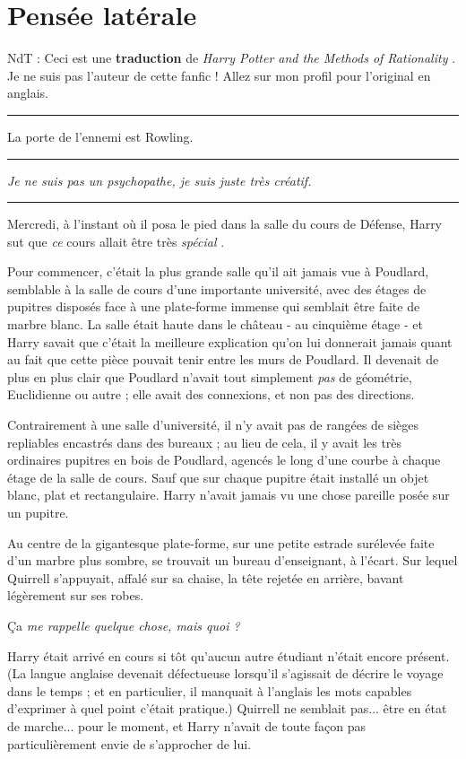 
\chapter{Pensée latérale}

NdT : Ceci est une \textbf{traduction}  de \emph{Harry Potter and the Methods of Rationality} . Je ne suis pas l'auteur de cette fanfic ! Allez sur mon profil pour l'original en anglais.
\par\noindent\rule{\textwidth}{0.4pt}
La porte de l'ennemi est Rowling.
\par\noindent\rule{\textwidth}{0.4pt}
\emph{Je ne suis pas un psychopathe, je suis juste très créatif.} 
\par\noindent\rule{\textwidth}{0.4pt}
Mercredi, à l'instant où il posa le pied dans la salle du cours de Défense, Harry sut que \emph{ce}  cours allait être très \emph{spécial} .

Pour commencer, c'était la plus grande salle qu'il ait jamais vue à Poudlard, semblable à la salle de cours d'une importante université, avec des étages de pupitres disposés face à une plate-forme immense qui semblait être faite de marbre blanc. La salle était haute dans le château - au cinquième étage - et Harry savait que c'était la meilleure explication qu'on lui donnerait jamais quant au fait que cette pièce pouvait tenir entre les murs de Poudlard. Il devenait de plus en plus clair que Poudlard n'avait tout simplement \emph{pas}  de géométrie, Euclidienne ou autre ; elle avait des connexions, et non pas des directions.

Contrairement à une salle d'université, il n'y avait pas de rangées de sièges repliables encastrés dans des bureaux ; au lieu de cela, il y avait les très ordinaires pupitres en bois de Poudlard, agencés le long d'une courbe à chaque étage de la salle de cours. Sauf que sur chaque pupitre était installé un objet blanc, plat et rectangulaire. Harry n'avait jamais vu une chose pareille posée sur un pupitre.

Au centre de la gigantesque plate-forme, sur une petite estrade surélevée faite d'un marbre plus sombre, se trouvait un bureau d'enseignant, à l'écart. Sur lequel Quirrell s'appuyait, affalé sur sa chaise, la tête rejetée en arrière, bavant légèrement sur ses robes.

Ça\emph{ me rappelle quelque chose, mais quoi ?} 

Harry était arrivé en cours si tôt qu'aucun autre étudiant n'était encore présent. (La langue anglaise devenait défectueuse lorsqu'il s'agissait de décrire le voyage dans le temps ; et en particulier, il manquait à l'anglais les mots capables d'exprimer à quel point c'était pratique.) Quirrell ne semblait pas... être en état de marche... pour le moment, et Harry n'avait de toute façon pas particulièrement envie de s'approcher de lui.

